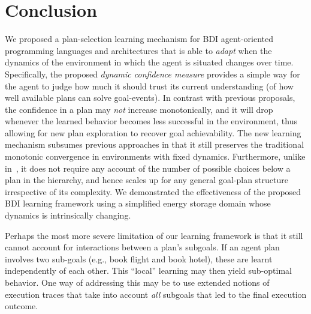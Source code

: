 \section{Conclusion}\label{sec:discussion}

We proposed a plan-selection learning mechanism for BDI agent-oriented programming languages and architectures that is able to \emph{adapt} when the dynamics of the environment in which the agent is situated changes over time.
Specifically, the proposed \emph{dynamic confidence measure} provides a simple way for the agent to judge how much it should trust its current understanding (of how well available plans can solve goal-events). 
In contrast with previous proposals, the confidence in a plan may \emph{not} increase monotonically, and it will drop whenever the learned behavior becomes less successful in the environment, thus allowing for new plan exploration to recover goal achievability. 
%
The new learning mechanism subsumes previous approaches in that it still preserves the traditional monotonic convergence in environments with fixed dynamics.
%
Furthermore, unlike in~\cite{singh10:extending,singh10:learning}, it does not require any account of the number of possible choices below a plan in the hierarchy, and hence scales up for any general goal-plan structure irrespective of its complexity. 
We demonstrated the effectiveness of the proposed BDI learning framework using a simplified energy storage domain whose dynamics is intrinsically changing.

Perhaps the most more severe limitation of our learning framework is that it still cannot account for interactions between a plan's subgoals. If an agent plan involves two sub-goals (e.g., book flight and book hotel), these are learnt independently of each other. This ``local'' learning may then yield sub-optimal behavior. One way of addressing this may be to use extended notions of execution traces that take into account \emph{all} subgoals that led to the final execution outcome.



